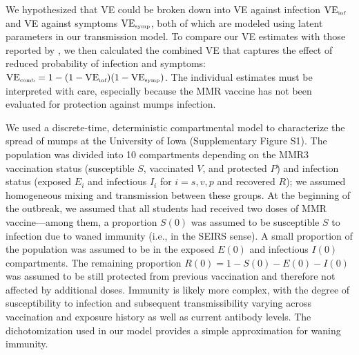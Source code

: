 \documentclass[12pt]{article}
\begin{document}
We hypothesized that VE could be broken down into VE against infection $\mathrm{VE}_{\textrm{\tiny{inf}}}$ and VE against symptoms $\mathrm{VE}_{\textrm{\tiny{symp}}}$, both of which are modeled using latent parameters in our transmission model.
To compare our VE estimates with those reported by \cite{cardemil2017effectiveness}, we then calculated the combined VE that captures the effect of reduced probability of infection and symptoms: $\mathrm{VE}_{\textrm{\tiny{comb}}} = 1 - (1 - \mathrm{VE}_{\textrm{\tiny{inf}}})(1- \mathrm{VE}_{\textrm{\tiny{symp}}})$.
The individual estimates must be interpreted with care, especially because the MMR vaccine has not been evaluated for protection against mumps infection. 

We used a discrete-time, deterministic compartmental model to characterize the spread of mumps at the University of Iowa (Supplementary Figure S1).
The population was divided into 10 compartments depending on the MMR3 vaccination status (susceptible $S$, vaccinated $V$, and protected $P$) and infection status (exposed $E_i$ and infectious $I_i$ for $i = s, v, p$ and recovered $R$); we assumed homogeneous mixing and transmission between these groups.
At the beginning of the outbreak, we assumed that all students had received two doses of MMR vaccine---among them, a proportion $S(0)$ was assumed to be susceptible $S$ to infection due to waned immunity (i.e., in the SEIRS sense).
A small proportion of the population was assumed to be in the exposed $E(0)$ and infectious $I(0)$ compartments.
The remaining proportion $R(0) = 1-S(0) - E(0) - I(0)$ was assumed to be still protected from previous vaccination and therefore not affected by additional doses.
Immunity is likely more complex, with the degree of susceptibility to infection and subsequent transmissibility varying across vaccination and exposure history as well as current antibody levels.
The dichotomization used in our model provides a simple approximation for waning immunity.
\end{document}
